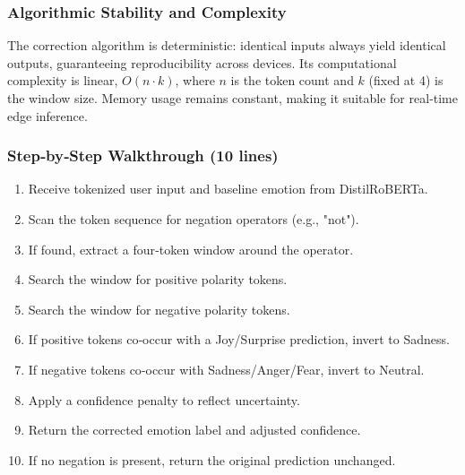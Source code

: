 \documentclass[12pt,twoside]{article}
\begin{document}
\subsubsection{Algorithmic Stability and Complexity}
The correction algorithm is deterministic: identical inputs always yield identical outputs, guaranteeing reproducibility across devices. Its computational complexity is linear, $O(n \cdot k)$, where $n$ is the token count and $k$ (fixed at 4) is the window size. Memory usage remains constant, making it suitable for real‑time edge inference.

\subsubsection{Step‑by‑Step Walkthrough (10 lines)}
\begin{enumerate}[label=\arabic*., leftmargin=2em]
  \item Receive tokenized user input and baseline emotion from DistilRoBERTa.
  \item Scan the token sequence for negation operators (e.g., "not").
  \item If found, extract a four‑token window around the operator.
  \item Search the window for positive polarity tokens.
  \item Search the window for negative polarity tokens.
  \item If positive tokens co‑occur with a Joy/Surprise prediction, invert to Sadness.
  \item If negative tokens co‑occur with Sadness/Anger/Fear, invert to Neutral.
  \item Apply a confidence penalty to reflect uncertainty.
  \item Return the corrected emotion label and adjusted confidence.
  \item If no negation is present, return the original prediction unchanged.
\end{enumerate}
\end{document}
